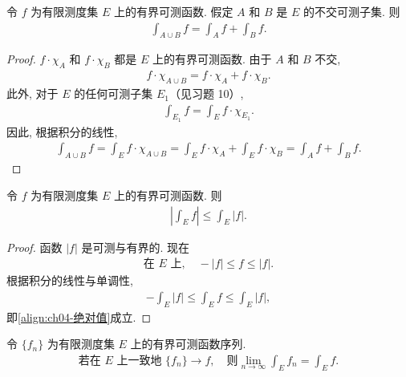 \documentclass[../../main.tex]{subfiles}
\begin{document}
\begin{corollary}\label{corollary:ch04-积分可加}
令 $f$ 为有限测度集 $E$ 上的有界可测函数. 假定 $A$ 和 $B$ 是 $E$ 的不交可测子集. 则
\begin{align}
\int_{A\cup B}f=\int_{A}f+\int_{B}f.\label{align:ch04-可加}
\end{align}
\end{corollary}

\begin{proof}
$f\cdot\chi_{A}$ 和 $f\cdot\chi_{B}$ 都是 $E$ 上的有界可测函数. 由于 $A$ 和 $B$ 不交,
\begin{align*}
f\cdot\chi_{A\cup B}=f\cdot\chi_{A}+f\cdot\chi_{B}.
\end{align*}
此外, 对于 $E$ 的任何可测子集 $E_{1}$（见习题 10）,
\begin{align*}
\int_{E_{1}}f=\int_{E}f\cdot\chi_{E_{1}}.
\end{align*}
因此, 根据积分的线性,
\begin{align*}
\int_{A\cup B}f=\int_{E}f\cdot\chi_{A\cup B}=\int_{E}f\cdot\chi_{A}+\int_{E}f\cdot\chi_{B}=\int_{A}f+\int_{B}f.
\end{align*}
\end{proof}

\begin{corollary}\label{corollary:ch04-积分绝对值}
令 $f$ 为有限测度集 $E$ 上的有界可测函数. 则
\begin{align}
\left|\int_{E}f\right|\leqslant\int_{E}|f|.\label{align:ch04-绝对值}
\end{align}
\end{corollary}

\begin{proof}
函数 $|f|$ 是可测与有界的. 现在
\begin{align*}
\text{在 }E\text{ 上},\quad-|f|\leqslant f\leqslant|f|.
\end{align*}
根据积分的线性与单调性,
\begin{align*}
-\int_{E}|f|\leqslant\int_{E}f\leqslant\int_{E}|f|,
\end{align*}
即\eqref{align:ch04-绝对值}成立.
\end{proof}

\begin{proposition}\label{proposition:ch04-一致收敛积分}
令 $\{f_{n}\}$ 为有限测度集 $E$ 上的有界可测函数序列.
\begin{align*}
\text{若在 }E\text{ 上一致地 }\{f_{n}\}\to f,\quad\text{则}\lim_{n\to\infty}\int_{E}f_{n}=\int_{E}f.
\end{align*}
\end{proposition}
\end{document}
